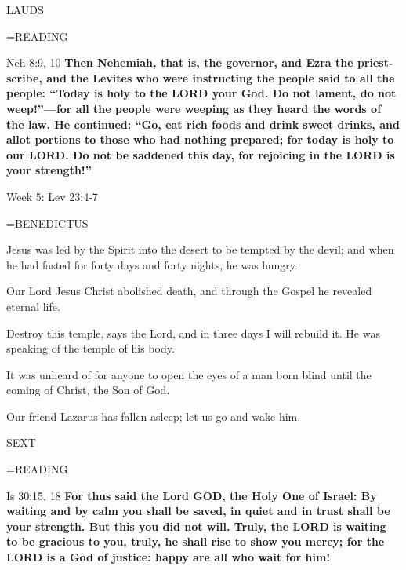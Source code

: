 \begin{flushleft}\normalsize LAUDS\\\end{flushleft}
\hangindent=\parindent \small READING
\begin{description}[labelindent=\parindent, leftmargin=*]
\item [Weeks 1-4:]     Neh 8:9, 10 \textbf{    Then Nehemiah, that is, the governor, and Ezra the priest-scribe, and the Levites who were instructing the people said to all the people: “Today is holy to the LORD your God. Do not lament, do not weep!”—for all the people were weeping as they heard the words of the law. He continued: “Go, eat rich foods and drink sweet drinks, and allot portions to those who had nothing prepared; for today is holy to our LORD. Do not be saddened this day, for rejoicing in the LORD is your strength!” \\}
\end{description}

Week 5:  Lev 23:4-7  

\hangindent=\parindent \small BENEDICTUS
\begin{description}[labelindent=\parindent, leftmargin=*]
\item [Week 1:] 	Jesus was led by the Spirit into the desert to be tempted by the devil; and when he had fasted for forty days and forty nights, he was hungry.
\item [Week 2:] 	Our Lord Jesus Christ abolished death, and through the Gospel he revealed eternal life.
\item [Week 3:] 	Destroy this temple, says the Lord, and in three days I will rebuild it. He was speaking of the temple of his body.
\item [Week 4:] 	It was unheard of for anyone to open the eyes of a man born blind until the coming of Christ, the Son of God.
\item [Week 5:] 	Our friend Lazarus has fallen asleep; let us go and wake him.
\end{description}

\begin{flushleft}\normalsize SEXT\\\end{flushleft}
\hangindent=\parindent \small READING
\begin{description}[labelindent=\parindent, leftmargin=*]
\item [Week 1-4:]   Is 30:15, 18 \textbf{  For thus said the Lord GOD, the Holy One of Israel: By waiting and by calm you shall be saved, in quiet and in trust shall be your strength. But this you did not will. Truly, the LORD is waiting to be gracious to you, truly, he shall rise to show you mercy; for the LORD is a God of justice: happy are all who wait for him!\\}
\end{description}

